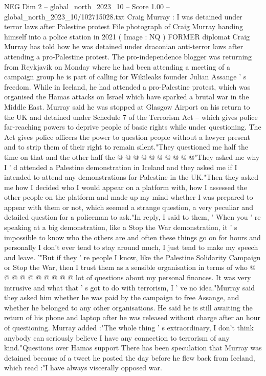 \begin{textsample}{NEG Dim 2 – global\_north\_2023\_10 – Score 1.00 – global\_north\_2023\_10/102715028.txt}  \label{ex:f2_neg_168}
Craig Murray : I was detained under terror laws after Palestine protest File photograph of Craig Murray handing himself into a police station in 2021 ( Image : NQ ) FORMER diplomat Craig Murray has told how he was detained under draconian anti-terror laws after attending a pro-Palestine protest.
The pro-independence blogger was returning from Reykjavik on Monday where he had been attending a meeting of a campaign group he is part of calling for Wikileaks founder Julian Assange ' s freedom.
While in Iceland, he had attended a pro-Palestine protest, which was organised the Hamas attacks on Israel which have sparked a brutal war in the Middle East.
Murray said he was stopped at Glasgow Airport on his return to the UK and detained under Schedule 7 of the Terrorism Act -- which gives police far-reaching powers to deprive people of basic rights while under questioning.
The Act gives police officers the power to question people without a lawyer present and to strip them of their right to remain silent."They questioned me half the time on that and the other half the @ @ @ @ @ @ @ @ @ @"They asked me why I ' d attended a Palestine demonstration in Iceland and they asked me if I intended to attend any demonstrations for Palestine in the UK."Then they asked me how I decided who I would appear on a platform with, how I assessed the other people on the platform and made up my mind whether I was prepared to appear with them or not, which seemed a strange question, a very peculiar and detailed question for a policeman to ask."In reply, I said to them, ' When you ' re speaking at a big demonstration, like a Stop the War demonstration, it ' s impossible to know who the others are and often these things go on for hours and personally I don't ever tend to stay around much, I just tend to make my speech and leave. '"But if they ' re people I know, like the Palestine Solidarity Campaign or Stop the War, then I trust them as a sensible organisation in terms of who @ @ @ @ @ @ @ @ @ @ lot of questions about my personal finances.
It was very intrusive and what that ' s got to do with terrorism, I ' ve no idea."Murray said they asked him whether he was paid by the campaign to free Assange, and whether he belonged to any other organisations.
He said he is still awaiting the return of his phone and laptop after he was released without charge after an hour of questioning.
Murray added :"The whole thing ' s extraordinary, I don't think anybody can seriously believe I have any connection to terrorism of any kind."Questions over Hamas support There has been speculation that Murray was detained because of a tweet he posted the day before he flew back from Iceland, which read :"I have always viscerally opposed war.

\end{textsample}
